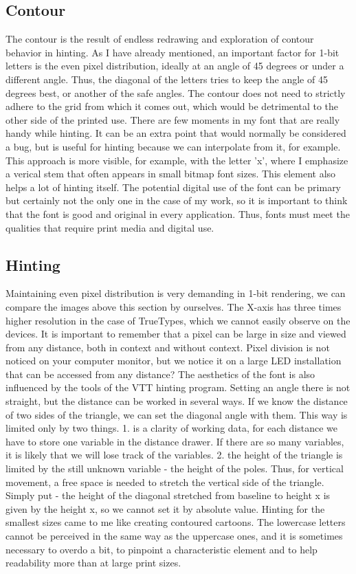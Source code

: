 \documentclass[a4paper]{article}
\begin{document}
\subsection{Contour}
The contour is the result of endless redrawing and exploration of contour behavior in hinting. As I have already mentioned, an important factor for 1-bit letters is the even pixel distribution, ideally at an angle of 45 degrees or under a different angle. Thus, the diagonal of the letters tries to keep the angle of 45 degrees best, or another of the safe angles. The contour does not need to strictly adhere to the grid from which it comes out, which would be detrimental to the other side of the printed use. There are few moments in my font that are really handy while hinting. It can be an extra point that would normally be considered a bug, but is useful for hinting because we can interpolate from it, for example. This approach is more visible, for example, with the letter 'x', where I emphasize a verical stem that often appears in small bitmap font sizes. This element also helps a lot of hinting itself. The potential digital use of the font can be primary but certainly not the only one in the case of my work, so it is important to think that the font is good and original in every application. Thus, fonts must meet the qualities that require print media and digital use.
\subsection{Hinting}
Maintaining even pixel distribution is very demanding in 1-bit rendering, we can compare the images above this section by ourselves. The X-axis has three times higher resolution in the case of TrueTypes, which we cannot easily observe on the devices. It is important to remember that a pixel can be large in size and viewed from any distance, both in context and without context. Pixel division is not noticed on your computer monitor, but we notice it on a large LED installation that can be accessed from any distance? The aesthetics of the font is also influenced by the tools of the VTT hinting program. Setting an angle there is not straight, but the distance can be worked in several ways. If we know the distance of two sides of the triangle, we can set the diagonal angle with them. This way is limited only by two things. 1. is a clarity of working data, for each distance we have to store one variable in the distance drawer. If there are so many variables, it is likely that we will lose track of the variables. 2. the height of the triangle is limited by the still unknown variable - the height of the poles. Thus, for vertical movement, a free space is needed to stretch the vertical side of the triangle. Simply put - the height of the diagonal stretched from baseline to height x is given by the height x, so we cannot set it by absolute value. Hinting for the smallest sizes came to me like creating contoured cartoons. The lowercase letters cannot be perceived in the same way as the uppercase ones, and it is sometimes necessary to overdo a bit, to pinpoint a characteristic element and to help readability more than at large print sizes.
\end{document}
